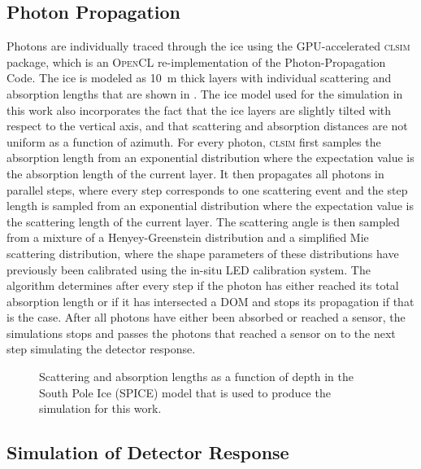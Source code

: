 \subsection{Photon Propagation}
\label{sec:photon-propagation}

Photons are individually traced through the ice using the GPU-accelerated \textsc{clsim}\cite{clsim} package, which is an \textsc{OpenCL} re-implementation of the Photon-Propagation Code.  The ice is modeled as 10~m thick layers with individual scattering and absorption lengths that are shown in . The ice model used for the simulation in this work also incorporates the fact that the ice layers are slightly tilted with respect to the vertical axis, and that scattering and absorption distances are not uniform as a function of azimuth. For every photon, \textsc{clsim} first samples the absorption length from an exponential distribution where the expectation value is the absorption length of the current layer. It then propagates all photons in parallel steps, where every step corresponds to one scattering event and the step length is sampled from an exponential distribution where the expectation value is the scattering length of the current layer. The scattering angle is then sampled from a mixture of a Henyey-Greenstein distribution and a simplified Mie scattering distribution, where the shape parameters of these distributions have previously been calibrated using the in-situ LED calibration system. The algorithm determines after every step if the photon has either reached its total absorption length or if it has intersected a DOM and stops its propagation if that is the case. After all photons have either been absorbed or reached a sensor, the simulations stops and passes the photons that reached a sensor on to the next step simulating the detector response.

\begin{figure}
    \centering
    
    \caption{Scattering and absorption lengths as a function of depth in the South Pole Ice (SPICE) model that is used to produce the simulation for this work.}
    \label{fig:spice-model}
\end{figure}


\subsection{Simulation of Detector Response}

